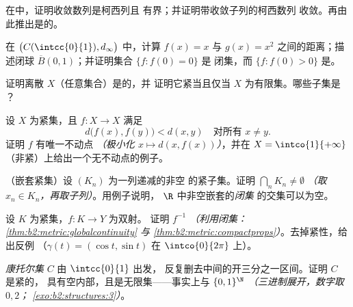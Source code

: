 \begin{exercise}[$\star$]\label{exo:b2:metric:2}
在中，证明收敛数列是柯西列且
有界；并证明带收敛子列的柯西数列
收敛。再由此推出是的。
\end{exercise}

\begin{exercise}[$\star$]\label{exo:b2:metric:3}
在 $\bigl(C(\intcc{0}{1}), d_\infty\bigr)$ 中，计算
$f(x) = x$ 与 $g(x) = x^2$ 之间的距离；描述闭球
$\overline B(0, 1)$；并证明集合 $\{f : f(0) = 0\}$ 是
闭集，而 $\{f : f(0) > 0\}$ 是。
\end{exercise}

\begin{exercise}[$\star\star$]\label{exo:b2:metric:4}
证明离散 $X$（任意集合）是的，并
证明它紧当且仅当 $X$ 为有限集。哪些子集是
？
\end{exercise}

\begin{exercise}[$\star\star$]\label{exo:b2:metric:5}
设 $X$ 为紧集，且 $f \colon X \to X$ 满足
\[
d\bigl(f(x), f(y)\bigr) < d(x, y) \quad \text{对所有 } x \neq y .
\]
证明 $f$ 有唯一不动点 \emph{（极小化 $x \mapsto
d(x, f(x))$）}，并在 $X = \intco{1}{+\infty}$
（非紧）上给出一个无不动点的例子。
\end{exercise}

\begin{exercise}[$\star\star$]\label{exo:b2:metric:6}
（嵌套紧集）设 $(K_n)$ 为一列递减的非空
的紧子集。证明 $\bigcap_n K_n \neq
\emptyset$ \emph{（取 $x_n \in K_n$，再取子列）}。用例子说明，
$\R$ 中非空嵌套的\emph{闭集}
的交集可以为空。
\end{exercise}

\begin{exercise}[$\star\star$]\label{exo:b2:metric:7}
设 $K$ 为紧集，$f \colon K \to Y$ 为双射。
证明 $f^{-1}$  \emph{（利用闭集：
\cref{thm:b2:metric:globalcontinuity} 与
\cref{thm:b2:metric:compactprops}）}。去掉紧性，给出反例
（$\gamma(t) = (\cos t, \sin t)$ 在
$\intco{0}{2\pi}$ 上）。
\end{exercise}

\begin{exercise}[$\star\star$]\label{exo:b2:metric:8}
\emph{康托尔集} $C$ 由 $\intcc{0}{1}$ 出发，
反复删去中间的开三分之一区间。证明 $C$ 是紧的，
具有空内部，且是无限集——事实上与
$\{0,1\}^{\N}$  \emph{（三进制展开，数字取 $0,2$；
\cref{exo:b2:structures:3}）}。
\end{exercise}

